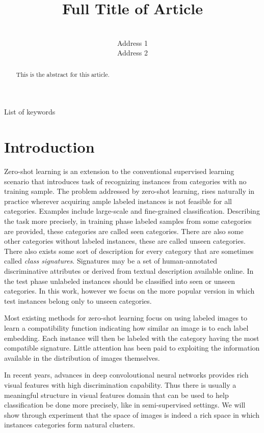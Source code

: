 \documentclass[wcp]{jmlr}
\title[Short Title]{Full Title of Article}
\author{\Name{Author Name1} \Email{abc@sample.com}\\
  \addr Address 1
  \AND
  \Name{Author Name2} \Email{xyz@sample.com}\\
  \addr Address 2
 }
\begin{document}
\maketitle

\begin{abstract}
This is the abstract for this article.
\end{abstract}
\begin{keywords}
List of keywords
\end{keywords}

\section{Introduction}
Zero-shot learning is an extension to the conventional supervised learning scenario
that introduces task of recognizing instances from categories with no training sample.
 The problem addressed by zero-shot learning, rises naturally in practice wherever acquiring ample labeled instances
 is not feasible for all categories. Examples include large-scale and fine-grained classification.
Describing the task more precisely, in training phase labeled samples from some categories are provided,
these categories are called seen categories. There are also some other categories without labeled instances, these are called unseen categories.
There also exists some sort of description for every category that are sometimes called \textit{class signatures}.
Signatures may be a set of human-annotated discriminative attributes or derived from textual description available online.
In the test phase unlabeled instances should be classified into seen or unseen categories. In this work, however we focus on the more popular version
in which test instances belong only to unseen categories.

Most existing methods for zero-shot learning focus on using labeled images to learn a compatibility function indicating how similar an image is
to each label embedding. Each instance will then be labeled with the category having the most compatible signature. Little attention
has been paid to exploiting the information available in the distribution of images themselves.

 In recent years, advances in deep convoloutional neural networks provides rich visual features with high discrimination capability.
 Thus there is usually a meaningful structure in visual features domain
that can be used to help classification be done more precisely, like in semi-supervised settings. We will show through experiment that
the space of images is indeed a rich space in which instances categories form natural clusters.
\end{document}
